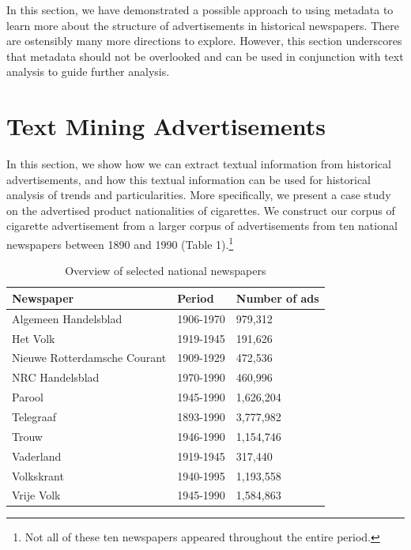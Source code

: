 \documentclass[USenglish]{article}
\begin{document}
In this section, we have demonstrated a possible approach to using metadata to learn more about the structure of advertisements in historical newspapers. There are ostensibly many more directions to explore. However, this section underscores that metadata should not be overlooked and can be used in conjunction with text analysis to guide further analysis. 

\section{Text Mining Advertisements}
In this section, we show how we can extract textual information from historical advertisements, and how this textual information can be used for historical analysis of trends and particularities. More specifically, we present a case study on the advertised product nationalities of cigarettes. We construct our corpus of cigarette advertisement from a larger corpus of advertisements from ten national newspapers between 1890 and 1990 (Table 1).\footnote{Not all of these ten newspapers appeared throughout the entire period.}

\begin{table}
  \centering
  \begin{tabular}{lll}
    \toprule
    \textbf{Newspaper} &
    \textbf{Period} &
    \textbf{Number of ads} \\
    \midrule
    Algemeen Handelsblad         & 1906-1970 &   979,312 \\
    Het Volk                     & 1919-1945 &   191,626 \\
    Nieuwe Rotterdamsche Courant & 1909-1929 &   472,536 \\
    NRC Handelsblad              & 1970-1990 &   460,996 \\
    Parool                       & 1945-1990 & 1,626,204 \\
    Telegraaf                    & 1893-1990 & 3,777,982 \\
    Trouw                        & 1946-1990 & 1,154,746 \\
    Vaderland                    & 1919-1945 &   317,440 \\
    Volkskrant                   & 1940-1995 & 1,193,558 \\
    Vrije Volk                   & 1945-1990 & 1,584,863 \\
    \bottomrule 
  \end{tabular}
  \caption{Overview of selected national newspapers}
\end{table}
\end{document}
